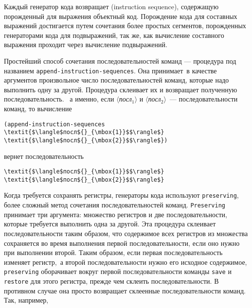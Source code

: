 Каждый 
генератор кода возвращает 
 (in\-struc\-tion sequence), содержащую порожденный для выражения объектный код.
Порождение кода для составных выражений достигается путем сочетания
более простых сегментов, порожденных генераторами кода для подвыражений, так же, как
вычисление составного выражения проходит через вычисление
подвыражений.

Простейший способ сочетания последовательностей команд
--- процедура под названием {\tt append-instruction-sequences}.
Она принимает~в качестве
аргументов произвольное число последовательностей команд, которые надо
выполнить одну за другой.  Процедура склеивает их и возвращает
полученную последовательность. ~а именно, если
\textit{$\langle$посл${}_{\mbox{1}}$$\rangle$} и
\textit{$\langle$посл${}_{\mbox{2}}$$\rangle$}~--- последовательности
команд, то вычисление

\begin{Verbatim}[fontsize=\small]
(append-instruction-sequences \textit{$\langle$посл${}_{\mbox{1}}$$\rangle$} \textit{$\langle$посл${}_{\mbox{2}}$$\rangle$})
\end{Verbatim}
вернет последовательность

\begin{Verbatim}[fontsize=\small]
\textit{$\langle$посл${}_{\mbox{1}}$$\rangle$}
\textit{$\langle$посл${}_{\mbox{2}}$$\rangle$}
\end{Verbatim}

Когда требуется сохранять регистры, генераторы кода
используют {\tt pre\-ser\-ving}, 
более сложный метод сочетания
последовательностей команд.  {\tt Pre\-ser\-ving} принимает три
аргумента: множество регистров и две последовательности, которые
требуется выполнить одна за другой.  Эта процедура склеивает
последовательности таким образом, что содержимое всех регистров из
множества сохраняется во время выполнения первой последовательности,
если оно нужно при выполнении второй.  Таким образом, если первая
последовательность изменяет регистр,~а второй последовательности нужно его исходное
содержимое, {\tt preserving} оборачивает вокруг первой
последовательности команды {\tt save} и {\tt restore}
для этого регистра, прежде чем склеить последовательности.  В
противном случае она просто возвращает склеенные последовательности
команд.  Так, например,

